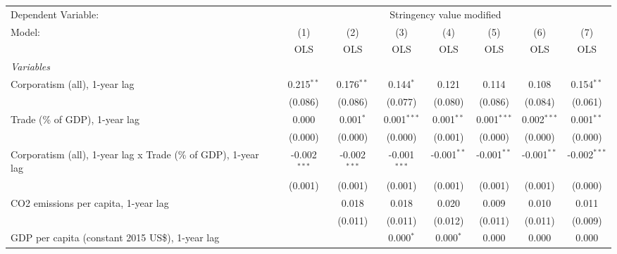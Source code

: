 
\begingroup
\centering
\begin{tabular}{lccccccc}
   \toprule
   Dependent Variable: & \multicolumn{7}{c}{Stringency value modified}\\
   Model:                                                         & (1)            & (2)            & (3)            & (4)           & (5)           & (6)           & (7)\\  
                                                                  &  OLS           & OLS            & OLS            & OLS           & OLS           & OLS           & OLS\\  
   \midrule
   \emph{Variables}\\
   Corporatism (all), 1-year lag                                  & 0.215$^{**}$   & 0.176$^{**}$   & 0.144$^{*}$    & 0.121         & 0.114         & 0.108         & 0.154$^{**}$\\   
                                                                  & (0.086)        & (0.086)        & (0.077)        & (0.080)       & (0.086)       & (0.084)       & (0.061)\\   
   Trade (\% of GDP), 1-year lag                                  & 0.000          & 0.001$^{*}$    & 0.001$^{***}$  & 0.001$^{**}$  & 0.001$^{***}$ & 0.002$^{***}$ & 0.001$^{**}$\\   
                                                                  & (0.000)        & (0.000)        & (0.000)        & (0.001)       & (0.000)       & (0.000)       & (0.000)\\   
   Corporatism (all), 1-year lag x Trade (\% of GDP), 1-year lag  & -0.002$^{***}$ & -0.002$^{***}$ & -0.001$^{***}$ & -0.001$^{**}$ & -0.001$^{**}$ & -0.001$^{**}$ & -0.002$^{***}$\\   
                                                                  & (0.001)        & (0.001)        & (0.001)        & (0.001)       & (0.001)       & (0.001)       & (0.000)\\   
   CO2 emissions per capita, 1-year lag                           &                & 0.018          & 0.018          & 0.020         & 0.009         & 0.010         & 0.011\\   
                                                                  &                & (0.011)        & (0.011)        & (0.012)       & (0.011)       & (0.011)       & (0.009)\\   
   GDP per capita (constant 2015 US\$), 1-year lag                &                &                & 0.000$^{*}$    & 0.000$^{*}$   & 0.000         & 0.000         & 0.000\\   

\end{tabular}
